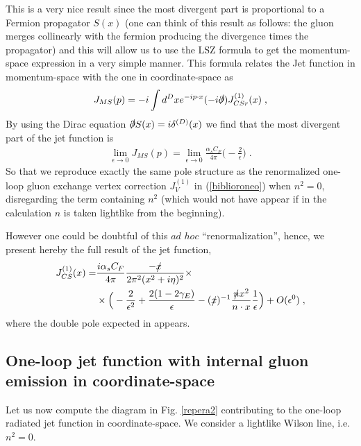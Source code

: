 \documentclass[%
 reprint,
 amsmath,amssymb,
 aps,
]{revtex4-1}
\begin{document}
This is a very nice result since the most divergent part is proportional to a Fermion propagator $S(x)$ (one can think of this result as follows: the gluon merges collinearly with the fermion producing the divergence times the propagator) and this will allow us to use the LSZ formula to get the momentum-space expression in a very simple manner. This formula relates the Jet function in momentum-space with the one in coordinate-space as
\begin{align}
J_{MS}(p)=-i\int {d^Dx} e^{-ip\cdot x} (-i\slashed\partial)J^{(1)}_{CSr}(x)\;,
\end{align}
By using the Dirac equation $\slashed\partial S(x)=i\delta^{(D)}(x)$ we find that the most divergent part of the jet function is
\begin{align}
\lim_{\epsilon\to0}J_{MS}(p)=\lim_{\epsilon\to0}\frac{\alpha_s C_F}{4\pi} \Big(-\frac{2}{\epsilon}\Big)\;.
\end{align}
So that we reproduce exactly the same pole structure as the renormalized one-loop gluon exchange vertex correction $J_V^{(1)}$ in (\ref{biblioroneo}) when $n^2=0$, disregarding the term containing $n^2$ (which would not have appear if in the calculation $n$ is taken lightlike from the beginning). \par 
However one could be doubtful of this $ad$ $hoc$ ``renormalization'', hence, we present hereby the full result of the jet function,
\begin{align}
J^{(1)}_{CS}(x)=&\frac{i \alpha_s C_F}{4\pi}\frac{-\slashed x}{2\pi^2(x^2+i\eta)^2}\times\nonumber\\
&\times\Big(-\frac{2}{\epsilon^2}+\frac{2(1-2\gamma_E)}{\epsilon}-(\slashed x)^{-1}\frac{\slashed n x^2}{n\cdot x}\frac{1}{\epsilon}\Big)+O(\epsilon^0)\;,
\end{align}
where the double pole expected in \cite{Bonoc} appears.
\subsection{One-loop jet function with internal gluon emission in coordinate-space}

Let us now compute the diagram in Fig. \ref{repera2} contributing to the one-loop radiated jet function in coordinate-space. We consider a lightlike Wilson line, i.e. $n^2=0$. 
\end{document}

